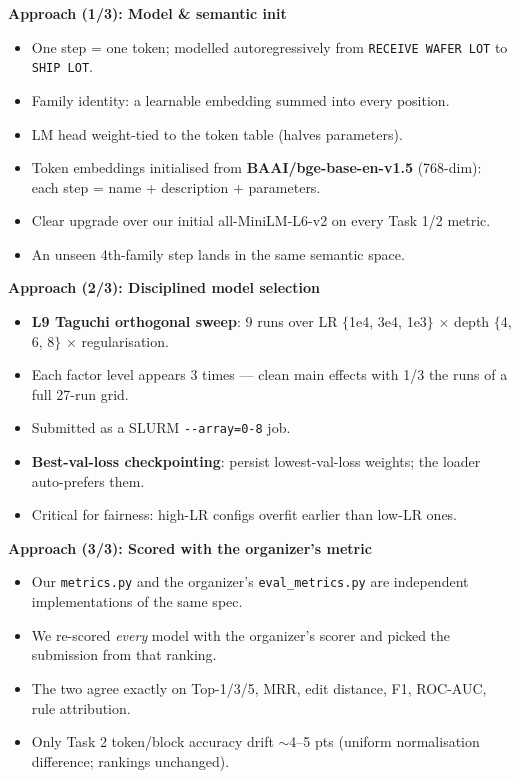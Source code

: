 \documentclass[12pt]{article}
\newcommand{\slide}[2]{%
  \begingroup
  {\color{navy}\Huge\bfseries #1\par}%
  \vspace{2pt}{\color{accent}\rule{\linewidth}{2pt}}\par
  \vspace{14pt}\Large #2
  \endgroup
  \clearpage}
\begin{document}
\slide{Approach (1/3): Model \& semantic init}{
\begin{itemize}
  \item One step = one token; modelled autoregressively from \texttt{RECEIVE WAFER LOT} to \texttt{SHIP LOT}.
  \item Family identity: a learnable embedding summed into every position.
  \item LM head weight-tied to the token table (halves parameters).
  \item Token embeddings initialised from \textbf{BAAI/bge-base-en-v1.5} (768-dim): each step = name + description + parameters.
  \item Clear upgrade over our initial all-MiniLM-L6-v2 on every Task 1/2 metric.
  \item An unseen 4th-family step lands in the same semantic space.
\end{itemize}}

\slide{Approach (2/3): Disciplined model selection}{
\begin{itemize}
  \item \textbf{L9 Taguchi orthogonal sweep}: 9 runs over LR $\{$1e\text{-}4, 3e\text{-}4, 1e\text{-}3$\}$ $\times$ depth $\{$4, 6, 8$\}$ $\times$ regularisation.
  \item Each factor level appears 3 times --- clean main effects with 1/3 the runs of a full 27-run grid.
  \item Submitted as a SLURM \texttt{-{}-array=0-8} job.
  \item \textbf{Best-val-loss checkpointing}: persist lowest-val-loss weights; the loader auto-prefers them.
  \item Critical for fairness: high-LR configs overfit earlier than low-LR ones.
\end{itemize}}

\slide{Approach (3/3): Scored with the organizer's metric}{
\begin{itemize}
  \item Our \texttt{metrics.py} and the organizer's \texttt{eval\_metrics.py} are independent implementations of the same spec.
  \item We re-scored \emph{every} model with the organizer's scorer and picked the submission from that ranking.
  \item The two agree exactly on Top-1/3/5, MRR, edit distance, F1, ROC-AUC, rule attribution.
  \item Only Task 2 token/block accuracy drift $\sim$4--5 pts (uniform normalisation difference; rankings unchanged).
\end{itemize}}
\end{document}
